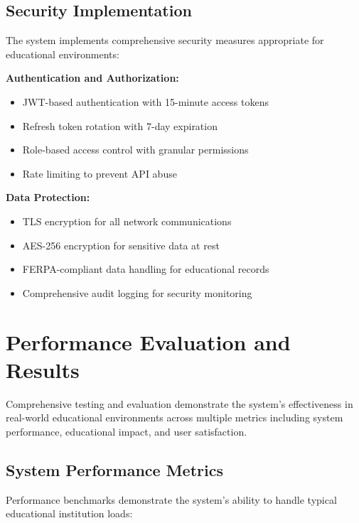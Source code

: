 \documentclass[onecolumn]{IEEEtran}
\begin{document}
\subsection{Security Implementation}

The system implements comprehensive security measures appropriate for educational environments:

\textbf{Authentication and Authorization:}
\begin{itemize}
\item JWT-based authentication with 15-minute access tokens \cite{jwt2024}
\item Refresh token rotation with 7-day expiration
\item Role-based access control with granular permissions
\item Rate limiting to prevent API abuse
\end{itemize}

\textbf{Data Protection:}
\begin{itemize}
\item TLS encryption for all network communications
\item AES-256 encryption for sensitive data at rest
\item FERPA-compliant data handling for educational records
\item Comprehensive audit logging for security monitoring
\end{itemize}

\section{Performance Evaluation and Results}

Comprehensive testing and evaluation demonstrate the system's effectiveness in real-world educational environments across multiple metrics including system performance, educational impact, and user satisfaction.

\subsection{System Performance Metrics}

Performance benchmarks demonstrate the system's ability to handle typical educational institution loads:
\end{document}
